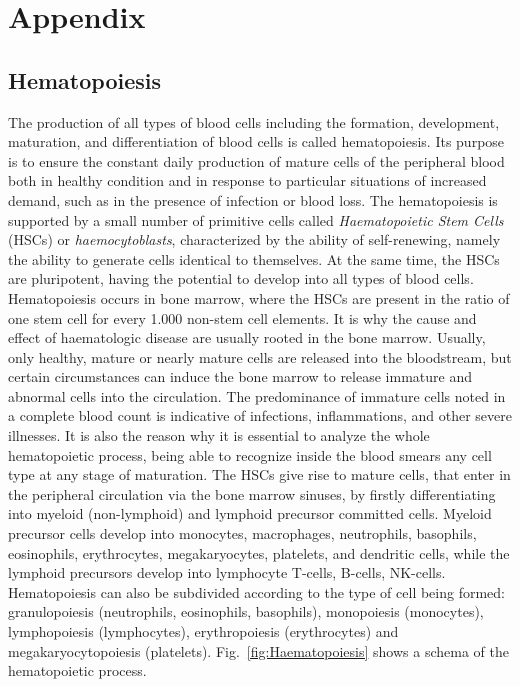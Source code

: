 \chapter{Appendix} \label{appendix}
\section{Hematopoiesis}
The production of all types of blood cells including the formation, development, maturation, and differentiation of blood cells is called hematopoiesis. Its purpose is to ensure the constant daily production of mature cells of the peripheral blood both in healthy condition and in response to particular situations of increased demand, such as in the presence of infection or blood loss. The hematopoiesis is supported by a small number of primitive cells called \textit{Haematopoietic Stem Cells} (\acs{HSC}s) or \textit{haemocytoblasts}, characterized by the ability of self-renewing, namely the ability to generate cells identical to themselves. At the same time, the HSCs are pluripotent, having the potential to develop into all types of blood cells. Hematopoiesis occurs in bone marrow, where the HSCs are present in the ratio of one stem cell for every 1.000 non-stem cell elements. It is why the cause and effect of haematologic disease are usually rooted in the bone marrow. Usually, only healthy, mature or nearly mature cells are released into the bloodstream, but certain circumstances can induce the bone marrow to release immature and abnormal cells into the circulation. The predominance of immature cells noted in a complete blood count is indicative of infections, inflammations, and other severe illnesses. It is also the reason why it is essential to analyze the whole hematopoietic process, being able to recognize inside the blood smears any cell type at any stage of maturation. The HSCs give rise to mature cells, that enter in the peripheral circulation via the bone marrow sinuses, by firstly differentiating into myeloid (non-lymphoid) and lymphoid precursor committed cells. Myeloid precursor cells develop into monocytes, macrophages, neutrophils, basophils, eosinophils, erythrocytes, megakaryocytes, platelets, and dendritic cells, while the lymphoid precursors develop into lymphocyte T-cells, B-cells, NK-cells. Hematopoiesis can also be subdivided according to the type of cell being formed: granulopoiesis (neutrophils, eosinophils, basophils), monopoiesis (monocytes), lymphopoiesis (lymphocytes), erythropoiesis (erythrocytes) and megakaryocytopoiesis (platelets). Fig.~\ref{fig:Haematopoiesis} shows a schema of the hematopoietic process.

